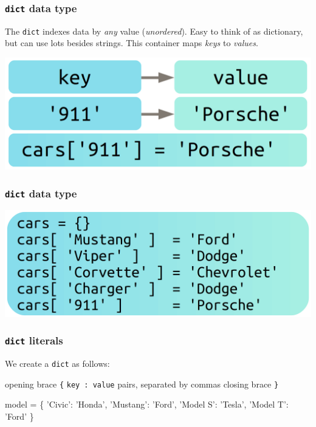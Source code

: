 \documentclass[11pt]{beamer}
\begin{document}
\begin{frame}[fragile]
  \frametitle{\texttt{dict} data type}
  \Enlarge

  \begin{itemize}
  \myitem  The \texttt{dict} indexes data by \emph{any} value (\emph{unordered}). %
  \myitem  Easy to think of as dictionary, but can use lots besides strings. %
  \myitem  This container maps \emph{keys} to \emph{values}. %
  \end{itemize}
  \includegraphics[height=0.333\textheight]{./img/dict-02.png}
\end{frame}

\begin{frame}[fragile]
  \frametitle{\texttt{dict} data type}
  \Enlarge

  \includegraphics[width=\textwidth]{./img/dict-03.png}
\end{frame}

\begin{frame}[fragile]
  \frametitle{\texttt{dict} literals}
  \Enlarge

  \begin{itemize}
  \myitem  We create a \texttt{dict} as follows:
    \begin{itemize}
    \mysubitem  opening brace \texttt{\{}
    \mysubitem  \texttt{key : value} pairs, separated by commas
    \mysubitem  closing brace \texttt{\}}
    \end{itemize}
  \end{itemize} %
  \begin{semiverbatim}
model = \{
  'Civic': 'Honda',
  'Mustang': 'Ford',
  'Model S': 'Tesla',
  'Model T': 'Ford'
\}
  \end{semiverbatim}
\end{frame}
\end{document}
